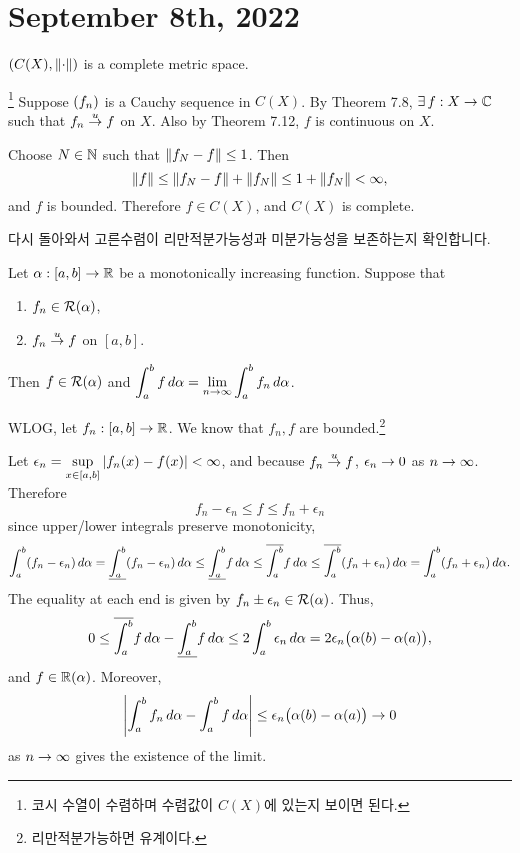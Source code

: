 \section*{September 8th, 2022}

 \((C(X), \left\lVert \cdot \right\rVert)\) is a complete metric space.

\pf \footnote{코시 수열이 수렴하며 수렴값이 \(C(X)\)에 있는지 보이면 된다.} Suppose \(\left( f_n \right)\) is a Cauchy sequence in \(C(X)\). By Theorem 7.8, \(\exists f: X\ra \C\) such that \(f_n \overset{u}{\rightarrow} f\) on \(X\). Also by Theorem 7.12, \(f\) is continuous on \(X\).

Choose \(N\in \mathbb{N}\) such that \(\left\lVert f_N - f \right\rVert \leq 1\). Then
\[
    \left\lVert f \right\rVert \leq \left\lVert f_N - f \right\rVert + \left\lVert f_N \right\rVert \leq 1 + \left\lVert f_N \right\rVert < \infty,
\]
and \(f\) is bounded. Therefore \(f \in C(X)\), and \(C(X)\) is complete.

\medskip

다시 돌아와서 고른수렴이 리만적분가능성과 미분가능성을 보존하는지 확인합니다.

 Let \(\alpha: [a, b] \rightarrow \mathbb{R}\) be a monotonically increasing function. Suppose that
\begin{enumerate}
    \item \(f_n \in \mathcal{R}(\alpha)\),
    \item \(f_n \overset{u}{\rightarrow} f\) on \([a, b]\).
\end{enumerate}
Then \(f \in \mathcal{R}(\alpha)\) and \(\displaystyle \int_a^b f \,d{\alpha} = \lim_{n \rightarrow \infty} \int_a^b f_n \,d{\alpha}\).

\pf WLOG, let \(f_n: [a, b] \rightarrow \mathbb{R}\). We know that \(f_n, f\) are bounded.\footnote{리만적분가능하면 유계이다.}

Let \(\epsilon_n = \displaystyle \sup_{x \in [a, b]} \left| f_n(x) - f(x) \right| < \infty\), and because \(f_n \overset{u}{\rightarrow} f\), \(\epsilon_n \rightarrow 0\) as \(n \rightarrow \infty\). Therefore
\[
    f_n - \epsilon_n \leq f \leq f_n + \epsilon_n
\]
since upper/lower integrals preserve monotonicity,
\[
    \int_a^b (f_n - \epsilon_n) \,d{\alpha} = \underline{\int_{a}^{b}} (f_n - \epsilon_n) \,d{\alpha} \leq \underline{\int_{a}^{b}} f \,d{\alpha} \leq \overline{\int_{a}^{b}} f \,d{\alpha} \leq \overline{\int_{a}^{b}} (f_n + \epsilon_n) \,d{\alpha} = \int_a^b (f_n + \epsilon_n) \,d{\alpha}.
\]
The equality at each end is given by \(f_n \pm \epsilon_n \in \mathcal{R}(\alpha)\). Thus,
\[
    0 \leq \overline{\int_{a}^{b}} f \,d{\alpha} - \underline{\int_{a}^{b}} f \,d{\alpha} \leq 2 \int_a^b \epsilon_n \,d{\alpha} = 2\epsilon_n \big(\alpha(b) - \alpha(a)\big),
\]
and \(f \in \mathcal{\mathbb{R}}(\alpha)\). Moreover,
\[
    \left| \int_a^b f_n \,d{\alpha} - \int_a^b f \,d{\alpha} \right| \leq \epsilon_n \big(\alpha(b) - \alpha(a)\big) \rightarrow 0
\]
as \(n \rightarrow \infty\) gives the existence of the limit.

